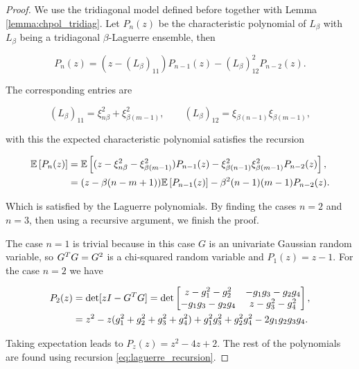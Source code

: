 \begin{proof}
    We use the tridiagonal model defined before together with Lemma \ref{lemma:chpol_tridiag}. Let $P_n(z)$ be the characteristic polynomial of $L_\beta$ with $L_\beta$ being a tridiagonal $\beta$-Laguerre ensemble, then

    \begin{equation*}
        P_n(z) = (z - (L_\beta)_{11})P_{n-1}(z) - (L_\beta)_{12}^2 P_{n-2}(z).
    \end{equation*}

    The corresponding entries are

    \begin{equation*}
        (L_\beta)_{11} = \xi^2_{n\beta} + \xi^2_{\beta(m-1)}, \qquad (L_\beta)_{12} = \xi_{\beta(n-1)}\xi_{\beta(m-1)},
    \end{equation*}

    \noindent with this the expected characteristic polynomial satisfies the recursion

    \begin{align} \label{eq:laguerre_recursion}
        \mathbb E \left[ P_n(z) \right] &= \mathbb E \left[  (z - \xi^2_{n\beta} - \xi^2_{\beta(m-1)})P_{n-1}(z) - \xi^2_{\beta(n-1)}\xi_{\beta(m-1)}^2 P_{n-2}(z)  \right],\\ 
        &= (z - \beta(n - m + 1))\mathbb E \left[ P_{n-1}(z) \right] - \beta^2(n-1)(m-1)P_{n-2}(z).
    \end{align}

    Which is satisfied by the Laguerre polynomials. By finding the cases $n=2$ and $n=3$, then using a recursive argument, we finish the proof.

    The case $n=1$ is trivial because in this case $G$ is an univariate Gaussian random variable, so $G^TG = G^2$ is a chi-squared random variable and $P_1(z) = z - 1$. For the case $n=2$ we have

    \begin{align*}
        P_2(z) &= \det[zI - G^TG] = \det\begin{bmatrix}
            z- g_1^2 - g_2^2 & -g_1g_3 - g_2 g_4 \\
            - g_1g_3 - g_2 g_4 & z - g_3^2 - g_4^2
        \end{bmatrix}, \\
        &= z^2 - z(g_1^2 + g_2^2 + g_3^2 + g_4^2) +g_1^2 g_3^2 + g_2^2g_4^2 -2g_1g_2g_3g_4.
    \end{align*}

    Taking expectation leads to $P_z(z) = z^2 - 4z + 2$. The rest of the polynomials are found using recursion \eqref{eq:laguerre_recursion}.
\end{proof}

